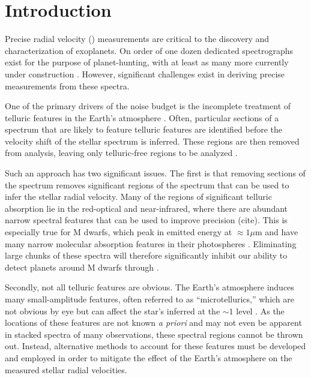 \documentclass[modern]{aastex62}
\begin{document}
\section{Introduction}

Precise radial velocity (\RV) measurements are critical to the discovery and characterization of exoplanets. 
On order of one dozen dedicated spectrographs exist for the purpose of \RV planet-hunting, with at least as many more currently under construction \citep{Wright2017}. 
However, significant challenges exist in deriving precise \RV measurements from these spectra. 

One of the primary drivers of the \RV noise budget is the incomplete treatment of telluric features in the
Earth's atmosphere \citep{Halverson2016}. 
Often, particular sections of a spectrum that are likely to feature telluric features are identified before the velocity shift of the stellar spectrum is inferred. 
These regions are then removed from analysis, leaving only telluric-free regions to be analyzed \citep[e.g.][]{AngladaEscude2012}.

Such an approach has two significant issues. 
The first is that removing sections of the spectrum removes significant regions of the spectrum that can be used to infer the stellar radial velocity. 
Many of the regions of significant telluric absorption lie in the red-optical and near-infrared, where there are abundant narrow spectral features that can be used to improve \RV precision (cite).
This is especially true for M dwarfs, which peak in emitted energy at $\approx 1 \mu$m and have many narrow molecular absorption features in their photospheres \citep{Figueira2016}.
Eliminating large chunks of these spectra will therefore significantly inhibit our ability to detect planets around M dwarfs through \RVs.

Secondly, not all telluric features are obvious. 
The Earth's atmosphere induces many small-amplitude features, often referred to as ``microtellurics,'' which are not obvious by eye but can affect the star's inferred \RV at the $\sim 1$ \ms level \citep{Cunha2014}. 
As the locations of these features are not known \textit{a priori} and may not even be apparent in stacked spectra of many observations, these spectral regions cannot be thrown out. 
Instead, alternative methods to account for these features must be developed and employed in order to mitigate the effect of the Earth's atmosphere on the measured stellar radial velocities.
\end{document}
